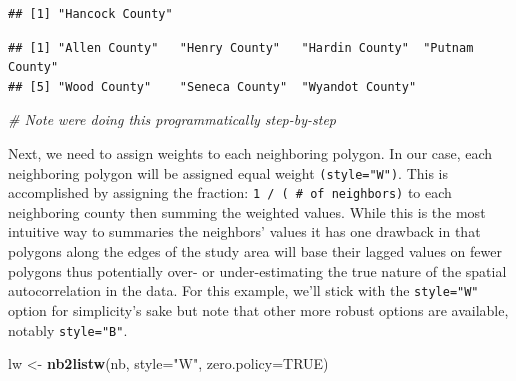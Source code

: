 \documentclass[]{article}
\newenvironment{Shaded}{\begin{snugshade}}{\end{snugshade}}
\newcommand{\AttributeTok}[1]{\textcolor[rgb]{0.13,0.29,0.53}{#1}}
\newcommand{\CommentTok}[1]{\textcolor[rgb]{0.56,0.35,0.01}{\textit{#1}}}
\newcommand{\ConstantTok}[1]{\textcolor[rgb]{0.56,0.35,0.01}{#1}}
\newcommand{\DecValTok}[1]{\textcolor[rgb]{0.00,0.00,0.81}{#1}}
\newcommand{\FunctionTok}[1]{\textcolor[rgb]{0.13,0.29,0.53}{\textbf{#1}}}
\newcommand{\NormalTok}[1]{#1}
\newcommand{\OtherTok}[1]{\textcolor[rgb]{0.56,0.35,0.01}{#1}}
\newcommand{\SpecialCharTok}[1]{\textcolor[rgb]{0.81,0.36,0.00}{\textbf{#1}}}
\newcommand{\StringTok}[1]{\textcolor[rgb]{0.31,0.60,0.02}{#1}}
\begin{document}
\begin{Shaded}
\end{Shaded}

\begin{verbatim}
## [1] "Hancock County"
\end{verbatim}

\begin{Shaded}
\end{Shaded}

\begin{verbatim}
## [1] "Allen County"   "Henry County"   "Hardin County"  "Putnam County" 
## [5] "Wood County"    "Seneca County"  "Wyandot County"
\end{verbatim}

\begin{Shaded}
\begin{Highlighting}[]
\CommentTok{\# Note we\textquotesingle{}re doing this programmatically step{-}by{-}step}
\end{Highlighting}
\end{Shaded}

Next, we need to assign weights to each neighboring polygon. In our
case, each neighboring polygon will be assigned equal weight
\texttt{(style="W")}. This is accomplished by assigning the fraction:
\texttt{1\ /\ (\ \#\ of\ neighbors)} to each neighboring county then
summing the weighted values. While this is the most intuitive way to
summaries the neighbors' values it has one drawback in that polygons
along the edges of the study area will base their lagged values on fewer
polygons thus potentially over- or under-estimating the true nature of
the spatial autocorrelation in the data. For this example, we'll stick
with the \texttt{style="W"} option for simplicity's sake but note that
other more robust options are available, notably \texttt{style="B"}.

\begin{Shaded}
\begin{Highlighting}[]
\NormalTok{lw }\OtherTok{\textless{}{-}} \FunctionTok{nb2listw}\NormalTok{(nb, }\AttributeTok{style=}\StringTok{"W"}\NormalTok{, }\AttributeTok{zero.policy=}\ConstantTok{TRUE}\NormalTok{)}
\end{Highlighting}
\end{Shaded}
\end{document}
